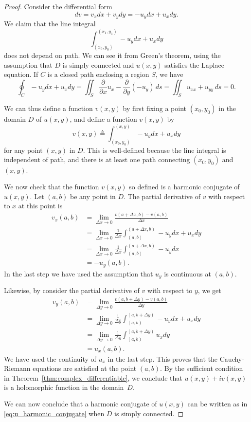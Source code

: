 \begin{proof}

Consider the differential form
$$
dv = v_xdx + v_y dy =-u_y dx + u_x dy. 
$$
We claim that the line integral 
\begin{equation}
	\int_{(x_0,y_0)}^{(x_1,y_1)} -u_y dx + u_x dy
	\label{eq:harmonic_conjugate_proof}
\end{equation}
does not depend on path. We can see it from Green's theorem, using the assumption that $D$ is simply connected and $u(x,y)$ satisfies the Laplace equation. If $C$ is a closed path enclosing a region $S$, we have
$$
\oint_C -u_y dx + u_x dy = \iint_S \frac{\partial}{\partial x} u_x - \frac{\partial}{\partial y}(-u_y) \, ds = \iint_S u_{xx}+u_{yy} \, ds= 0.
$$

We can thus define a function $v(x,y)$ by first fixing a point $(x_0,y_0)$ in the domain $D$ of $u(x,y)$, and define a function $v(x,y)$ by
\begin{equation}
	v(x,y) \triangleq \int_{(x_0,y_0)}^{(x,y)}-u_y dx + u_x dy
	\label{eq:u_harmonic_conjugate}
\end{equation}
for any point $(x,y)$ in $D$. This is well-defined because the line integral is independent of path, and there is at least one path connecting $(x_0,y_0)$ and $(x,y)$.

We now check that the function $v(x,y)$ so defined is a harmonic conjugate of $u(x,y)$. Let $(a,b)$ be any point in $D$. The partial derivative of $v$ with respect to $x$ at this point is
\begin{align*}
	v_x(a,b) &= \lim_{\Delta x\rightarrow 0} 
	\frac{v(a+\Delta x,b)-v(a,b)}{\Delta x} \\
	&= \lim_{\Delta x\rightarrow 0} \frac{1}{\Delta x} \int_{(a,b)}^{(a+\Delta x,b)}  -u_y dx + u_x dy \\
	&= \lim_{\Delta x\rightarrow 0} \frac{1}{\Delta x} \int_{(a,b)}^{(a+\Delta x,b)}  -u_y dx\\
	&= - u_y(a,b).
\end{align*}
In the last step we have used the assumption that $u_y$ is continuous at $(a,b)$.

Likewise, by consider the partial derivative of $v$ with respect to $y$, we get
\begin{align*}
	v_y(a,b) &= \lim_{\Delta y\rightarrow 0} 
	\frac{v(a,b+\Delta y)-v(a,b)}{\Delta y} \\
	&= \lim_{\Delta y\rightarrow 0} \frac{1}{\Delta y} \int_{(a,b)}^{(a,b+\Delta y)}  -u_y dx + u_x dy \\
	&= \lim_{\Delta y\rightarrow 0} \frac{1}{\Delta y} \int_{(a,b)}^{(a,b+\Delta y)}  u_x dy\\
	&= u_x(a,b).
\end{align*}
We have used the continuity of $u_x$ in the last step. This proves that the Cauchy-Riemann equations are satisfied at the point $(a,b)$. By the sufficient condition in Theorem~\ref{thm:complex_differentiable}, we conclude that $u(x,y)+i v(x,y)$ is a holomorphic function in the domain~$D$.


We can now conclude that a harmonic conjugate of $u(x,y)$ can be written as in \eqref{eq:u_harmonic_conjugate} when $D$ is simply connected. 
\end{proof}


